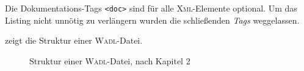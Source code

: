 Die Dokumentations-Tags \texttt{<doc>} sind für alle \textsc{Xml}-Elemente optional.
Um das Listing nicht unnötig zu verlängern wurden die schließenden \emph{Tags} weggelassen.

 zeigt die Struktur einer \textsc{Wadl}-Datei.

\newpage

\begin{figure}[!htb]
    \centering
    \resizebox{!}{0.5\paperheight}{
        
    }
    \caption{Struktur einer \textsc{Wadl}-Datei, nach Kapitel 2 \cite{hadleyWADL}}
    \label{fig:wadlstructure}
\end{figure}